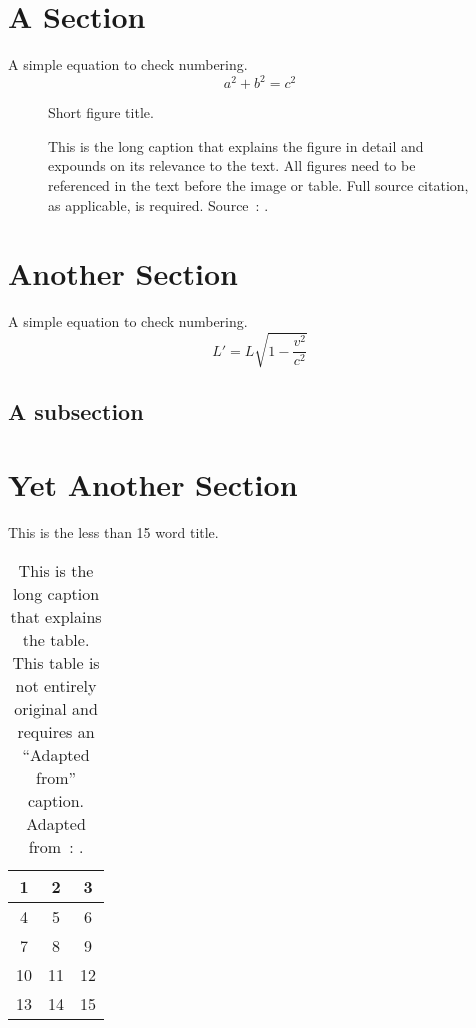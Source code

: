 \section{A Section}\label{sec:something}
A simple equation to check numbering.
\begin{equation}
a^2 + b^2 = c^2
\end{equation}
\lipsum[1-4] %

\begin{figure}
\framebox[\textwidth]{\parbox{\textwidth}{\lipsum[1]}} %
\caption[Short figure title (customized for LoF).]{Short figure title.}
\caption*{\small This is the long caption that explains the figure in detail and
expounds on its relevance to the text.
All figures need to be referenced in the text before the image or table.
Full source citation, as applicable, is required.
Source~\cite[Figure 10]{IEEEexample:article_typical}: .}
\end{figure}

\section{Another Section}
A simple equation to check numbering.
\begin{equation}
L' = {L}{\sqrt{1-\frac{v^2}{c^2}}}
\end{equation}
\lipsum[2-3] %

\subsection{A subsection}
\lipsum[5-6] %

\section{Yet Another Section}
\lipsum[1] %
\begin{table}
\caption{This is the less than 15 word title.}
\begin{center}
\begin{tabular}{ c c c }
\hline
  1 & 2 & 3 \\ \hline
  4 & 5 & 6 \\
  7 & 8 & 9 \\
  10 & 11 & 12 \\
  13 & 14 & 15 \\
\hline
\end{tabular}
\end{center}
\caption*{\small This is the long caption that explains the table.
This table is not entirely original and requires an ``Adapted from'' caption.
Adapted from~\cite[Table 5]{IEEEexample:article_typical}: .}
\end{table}
\lipsum[2]


